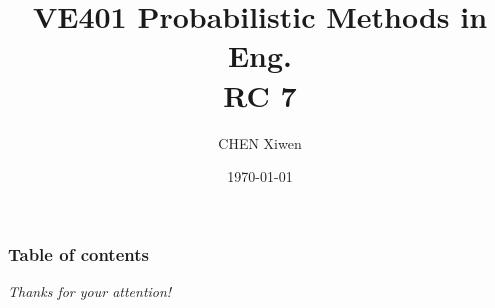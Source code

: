 \documentclass[11pt, hyperref={pdfpagelabels=true}]{beamer}
\title{VE401 Probabilistic Methods in Eng. \\RC 7}
\author{CHEN Xiwen}
\date{\today}
\institute[UM-JI]{UM-SJTU Joint Institute}
\newcommand{\highlightr}[1]{\textcolor[rgb]{1,0.3,0.2}{\emph{\textbf{#1}}}}
\begin{document}
\begin{frame}
\titlepage
\end{frame} 


\begin{frame}
\frametitle{Table of contents}
\tableofcontents
\end{frame} 



\begin{frame}{}

\centering
\emph{Thanks for your attention!}
  
\end{frame}
\end{document}
